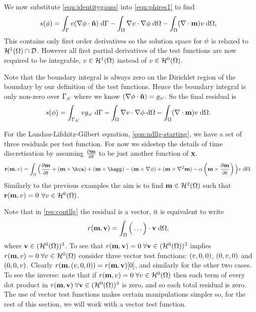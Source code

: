 We now substitute \cref{eqn:identitygauss} into \cref{eqn:phires1} to find
\begin{equation}
  s(\phi) = {\int_{{\Gamma}}  v (\nabla \phi \cdot \mathbf{\hat{n}})  {\; \text{d}} {{\Gamma}}}
  - {\int_{\Omega}  \nabla v \cdot \nabla \phi  {\; \text{d}} {\Omega}}
  - {\int_{\Omega}  (\nabla \cdot \mathbf{m}) v  {\; \text{d}} {\Omega}},
\end{equation}
This contains only first order derivatives so the solution space for $\phi$ is relaxed to $\mathcal{H}^1(\Omega) \cap \mathcal{D}$. 
However all first partial derivatives of the test functions are now required to be integrable, \ie $v \in \mathcal{H}^1(\Omega)$ instead of $v \in \mathcal{H}^0(\Omega)$.

Note that the boundary integral is always zero on the Dirichlet region of the boundary by our definition of the test functions. 
Hence the boundary integral is only non-zero over ${\Gamma}_{{\scriptscriptstyle{\mathcal{N}}}}$ where we know $(\nabla \phi \cdot \mathbf{\hat{n}}) = g_{{\scriptscriptstyle{\mathcal{N}}}}$.
So the final residual is
\begin{equation}
  s(\phi) = \int_{{\Gamma}_{\scriptscriptstyle{\mathcal{N}}}} v g_{\scriptscriptstyle{\mathcal{N}}} {\; \text{d}} {\Gamma}
  - {\int_{\Omega}  \nabla v \cdot \nabla \phi {\; \text{d}} {\Omega}}
  - {\int_{\Omega}  (\nabla \cdot \mathbf{m}) v {\; \text{d}} {\Omega}}.
  \label{res:contphi}
\end{equation}


For the Landau-Lifshitz-Gilbert equation, \cref{eqn:ndllg-starting}, we have a set of three residuals per test function. 
For now we sidestep the details of time discretisation by assuming $\frac{\partial \mathbf{m}}{\partial t}$ to be just another function of $\mathbf{x}$.
\begin{equation}
  \rllgv(\mv, \test) = \int_\magd \Big( \dmdt
  + (\mv \times \hca) + (\mv \times \happ) \\
  - (\mv \times \nabla \phi) + (\mv \times \lap \mv)
  - \dampc \left( \mv \times \dmdt \right)
  \Big) \test \d\magd
  . \label{res:contllg}
\end{equation}
Similarly to the previous examples the aim is to find $\mathbf{m} \in \mathcal{H}^2(\Omega)$ such that $\mathbf{r}(\mathbf{m}, v) = 0$ $\forall v \in \mathcal{H}^0(\Omega)$.

Note that in \cref{res:contllg} the residual is a vector, it is equivalent to write
\begin{equation}
  r(\mathbf{m}, \mathbf{v}) = \int_\Omega \Big( \ldots  \Big) \cdot \mathbf{v} {\; \text{d}}\Omega,
\end{equation}
where $\mathbf{v} \in (\mathcal{H}^0(\Omega))^3$.
To see that $r(\mathbf{m}, \mathbf{v}) = 0\; \forall \mathbf{v} \in (\mathcal{H}^0(\Omega))^3$ implies $r(\mathbf{m}, v) = 0 \; \forall v \in \mathcal{H}^0(\Omega)$ consider three vector test functions: $(v, 0, 0)$, $(0, v, 0)$ and $(0, 0, v)$.
Clearly $r(\mathbf{m}, (v, 0, 0)) = r(\mathbf{m}, \mathbf{v})[0]$, and similarly for the other two cases.
To see the inverse: note that if $r(\mathbf{m}, v) = 0\; \forall v \in \mathcal{H}^0(\Omega)$ then each term of every dot product in $r(\mathbf{m}, \mathbf{v}) \; \forall \mathbf{v} \in (\mathcal{H}^0(\Omega))^3$ is zero, and so each total residual is zero.
The use of vector test functions makes certain manipulations simpler so, for the rest of this section, we will work with a vector test function.

